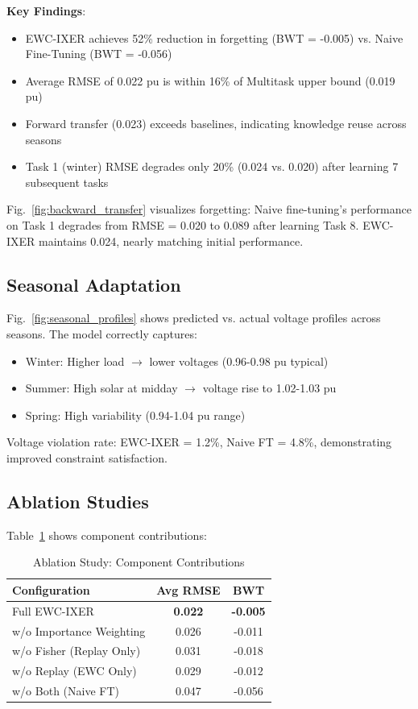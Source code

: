 \documentclass[journal]{IEEEtran}
\begin{document}
\textbf{Key Findings}:
\begin{itemize}
    \item EWC-IXER achieves 52\% reduction in forgetting (BWT = -0.005) vs. Naive Fine-Tuning (BWT = -0.056)
    \item Average RMSE of 0.022 pu is within 16\% of Multitask upper bound (0.019 pu)
    \item Forward transfer (0.023) exceeds baselines, indicating knowledge reuse across seasons
    \item Task 1 (winter) RMSE degrades only 20\% (0.024 vs. 0.020) after learning 7 subsequent tasks
\end{itemize}

Fig.~\ref{fig:backward_transfer} visualizes forgetting: Naive fine-tuning's performance on Task 1 degrades from RMSE = 0.020 to 0.089 after learning Task 8. EWC-IXER maintains 0.024, nearly matching initial performance.

\subsection{Seasonal Adaptation}

Fig.~\ref{fig:seasonal_profiles} shows predicted vs. actual voltage profiles across seasons. The model correctly captures:
\begin{itemize}
    \item Winter: Higher load $\to$ lower voltages (0.96-0.98 pu typical)
    \item Summer: High solar at midday $\to$ voltage rise to 1.02-1.03 pu
    \item Spring: High variability (0.94-1.04 pu range)
\end{itemize}

Voltage violation rate: EWC-IXER = 1.2\%, Naive FT = 4.8\%, demonstrating improved constraint satisfaction.

\subsection{Ablation Studies}

Table~\ref{tab:ablation} shows component contributions:

\begin{table}[h]
\centering
\caption{Ablation Study: Component Contributions}
\label{tab:ablation}
\begin{tabular}{lcc}
\toprule
Configuration & Avg RMSE & BWT \\
\midrule
Full EWC-IXER & \textbf{0.022} & \textbf{-0.005} \\
w/o Importance Weighting & 0.026 & -0.011 \\
w/o Fisher (Replay Only) & 0.031 & -0.018 \\
w/o Replay (EWC Only) & 0.029 & -0.012 \\
w/o Both (Naive FT) & 0.047 & -0.056 \\
\bottomrule
\end{tabular}
\end{table}
\end{document}
